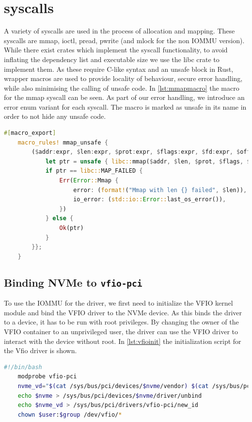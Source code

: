 \section{syscalls}
A variety of syscalls are used in the process of allocation and mapping. These syscalls are mmap, ioctl, pread, pwrite (and mlock for the non IOMMU version). While there exist crates which implement the syscall functionality, to avoid inflating the dependency list and executable size we use the libc crate to implement them. As these require C-like syntax and an unsafe block in Rust, wrapper macros are used to provide locality of behaviour, secure error handling, while also minimising the calling of unsafe code. In \autoref{lst:mmapmacro} the macro for the mmap syscall can be seen.
As part of our error handling, we introduce an error enum variant for each syscall. The macro is marked as unsafe in its name in order to not hide any unsafe code.

\begin{lstlisting}[language=Rust,caption={Syscall \texttt{mmap} macro, with own error variant}, label=lst:mmapmacro]
    #[macro_export]
    macro_rules! mmap_unsafe {
        ($addr:expr, $len:expr, $prot:expr, $flags:expr, $fd:expr, $offset:expr) => {{
            let ptr = unsafe { libc::mmap($addr, $len, $prot, $flags, $fd, $offset) };
            if ptr == libc::MAP_FAILED {
                Err(Error::Mmap {
                    error: (format!("Mmap with len {} failed", $len)),
                    io_error: (std::io::Error::last_os_error()),
                })
            } else {
                Ok(ptr)
            }
        }};
    } 
\end{lstlisting}

\subsection{Binding NVMe to \texttt{vfio-pci}}

To use the IOMMU for the driver, we first need to initialize the VFIO kernel module and bind the VFIO driver to the NVMe device.
As this binds the driver to a device, it has to be run with root privileges.
By changing the owner of the VFIO container to an unprivileged user, the driver can use the VFIO driver to interact with the device without root.
In \autoref{lst:vfioinit} the initialization script for the Vfio driver is shown.

\begin{lstlisting}[language=bash,caption={Initializing VFIO using bash}, label=lst:vfioinit, frame=single]
    #!/bin/bash
    modprobe vfio-pci
    nvme_vd="$(cat /sys/bus/pci/devices/$nvme/vendor) $(cat /sys/bus/pci/devices/$nvme/device)"
    echo $nvme > /sys/bus/pci/devices/$nvme/driver/unbind
    echo $nvme_vd > /sys/bus/pci/drivers/vfio-pci/new_id
    chown $user:$group /dev/vfio/*     
\end{lstlisting}

